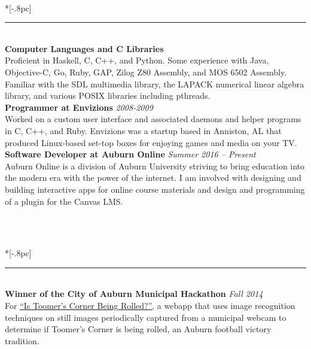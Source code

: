 \documentclass{article}
\begin{document}
 \\*[-.8pc]
\rule{\textwidth}{.1pt} \\
{\bf Computer Languages and C Libraries} \\
Proficient in Haskell, C, C++, and Python. Some experience with Java,
Objective-C, Go, Ruby, GAP, Zilog Z80 Assembly, and MOS 6502 Assembly. Familiar
with the SDL multimedia library, the LAPACK numerical linear algebra library,
and various POSIX libraries including pthreads. \\
\newpage
\noindent \textbf{Programmer at Envizions} \hfill \textit{2008-2009}\\
Worked on a custom user interface and associated daemons and helper
programs in C, C++, and Ruby. Envizions was a startup based in Anniston, AL that
produced Linux-based set-top boxes for enjoying games and media on your TV.\\
\textbf{Software Developer at Auburn Online} \hfill \textit{Summer 2016 --
  Present}\\
Auburn Online is a division of Auburn University striving to bring education
into the modern era with the power of the internet. I am involved with designing
and building interactive apps for online course materials and design and
programming of a plugin for the Canvas LMS.

\

 \\*[-.8pc]
\rule{\textwidth}{.1pt} \\
{\bf Winner of the City of Auburn Municipal Hackathon} \hfill {\it Fall 2014}\\
For \href{https://github.com/IsToomersCornerBeingRolledRightNow}{``Is Toomer's
  Corner Being Rolled?''}, a webapp that uses image recognition techniques on
still images periodically captured from a municipal webcam to determine if
Toomer's Corner is being rolled, an Auburn football victory tradition.
\\ \\
\end{document}
